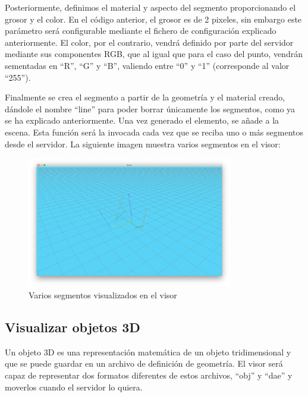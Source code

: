 Posteriormente, definimos el material y aspecto del segmento proporcionando el grosor y el color. En el código anterior, el grosor es de 2 pixeles, sin embargo este parámetro será configurable mediante el fichero de configuración explicado anteriormente. El color, por el contrario, vendrá definido por parte del servidor mediante sus componentes RGB, que al igual que para el caso del punto, vendrán sementadas en ``R'', ``G'' y ``B'', valiendo entre ``0''  y ``1'' (corresponde al valor ``255'').

Finalmente se crea el segmento a partir de la geometría y el material creado, dándole el nombre ``line'' para poder borrar únicamente los segmentos, como ya se ha explicado anteriormente. Una vez generado el elemento, se añade a la escena. Esta función será la invocada cada vez que se reciba uno o más segmentos desde el servidor. La siguiente imagen muestra varios segmentos en el visor:
\begin{figure}[H]
  \begin{center}
    \includegraphics[width=0.8\textwidth]{figures/visualizarlineas.png}
		\caption{Varios segmentos visualizados en el visor}
		\label{fig.visualizarsegmentos}
		\end{center}
\end{figure}

\subsection{Visualizar objetos 3D}
Un objeto 3D es una representación matemática de un objeto tridimensional y que se puede guardar en un archivo de definición de geometría. El visor será capaz de representar dos formatos diferentes de estos archivos, ``obj'' y ``dae'' y moverlos cuando el servidor lo quiera. 

